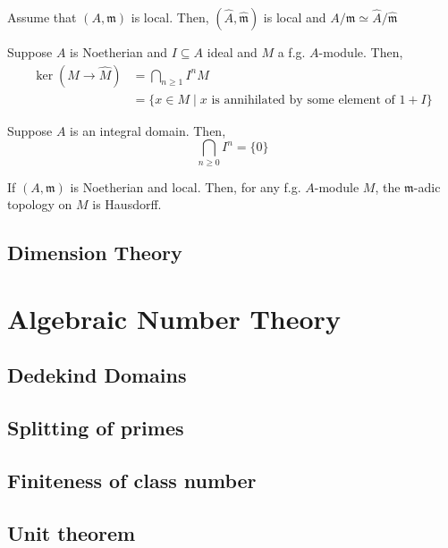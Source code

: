 \documentclass[oneside, 12pt]{scrbook}
\newcommand{\m}{\mathfrak{m}}
\theoremstyle{theorem}
\begin{document}
\begin{proposition}
Assume that $(A,\m)$ is local. Then, $(\widehat{A}, \widehat{\m})$ is local and $A/\m \simeq \widehat{A} / \widehat{\m}$
\end{proposition}

\begin{theorem}
Suppose $A$ is Noetherian and $I \subseteq A$ ideal and $M$ a f.g. $A$-module. Then, 
\begin{align*}
\ker(M \rightarrow \widehat{M}) &= \bigcap_{n \geq 1} I^n M \\
&= \{x\in M \mid x \text{ is annihilated by some element of }1 + I\}
\end{align*}
\end{theorem}

\begin{corollary}
Suppose $A$ is an integral domain. Then, $$\bigcap_{n \geq 0} I^n = \{0\}$$
\end{corollary}

\begin{theorem}
If $(A, \m)$ is Noetherian and local. Then, for any f.g. $A$-module $M$, the $\m$-adic topology on $M$ is Hausdorff.
\end{theorem}

\chapter{Dimension Theory}




\part{Algebraic Number Theory}

\chapter{Dedekind Domains}

\chapter{Splitting of primes}

\chapter{Finiteness of class number}

\chapter{Unit theorem}
\end{document}
